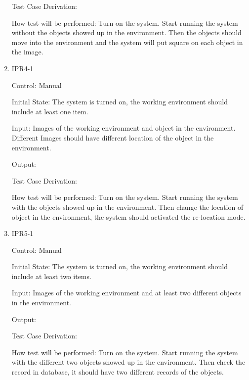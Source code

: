 \documentclass[12pt, titlepage]{article}
\begin{document}
\begin{enumerate}
Test Case Derivation: 
					
How test will be performed: Turn on the system. Start running the system without the objects showed up in the environment. Then the objects should move into the environment and the system will put square on each object in the image.


\item{IPR4-1\\}

Control: Manual
					
Initial State: The system is turned on, the working environment should include at least one item.
					
Input: Images of the working environment and object in the environment. Different Images should have different location of the object in the environment.
					
Output: 

Test Case Derivation: 
					
How test will be performed: Turn on the system. Start running the system with the objects showed up in the environment. Then change the location of object in the environment, the system should activated the re-location mode.


\item{IPR5-1\\}

Control: Manual
					
Initial State: The system is turned on, the working environment should include at least two items.
					
Input: Images of the working environment and at least two different objects in the environment. 
					
Output: 

Test Case Derivation: 
					
How test will be performed: Turn on the system. Start running the system with the different two objects showed up in the environment. Then check the record in database, it should have two different records of the objects.

				

\end{enumerate}
\end{document}
